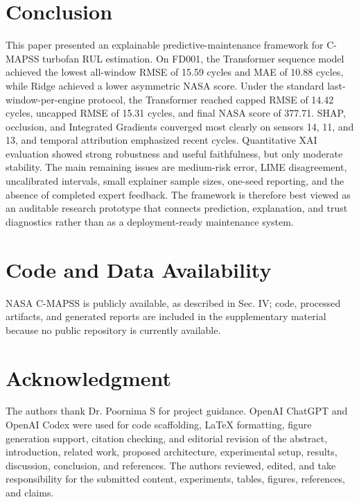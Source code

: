 \documentclass[conference]{IEEEtran}
\begin{document}
\section{Conclusion}
This paper presented an explainable predictive-maintenance framework for C-MAPSS turbofan RUL estimation. On FD001, the Transformer sequence model achieved the lowest all-window RMSE of 15.59 cycles and MAE of 10.88 cycles, while Ridge achieved a lower asymmetric NASA score. Under the standard last-window-per-engine protocol, the Transformer reached capped RMSE of 14.42 cycles, uncapped RMSE of 15.31 cycles, and final NASA score of 377.71. SHAP, occlusion, and Integrated Gradients converged most clearly on sensors 14, 11, and 13, and temporal attribution emphasized recent cycles. Quantitative XAI evaluation showed strong robustness and useful faithfulness, but only moderate stability. The main remaining issues are medium-risk error, LIME disagreement, uncalibrated intervals, small explainer sample sizes, one-seed reporting, and the absence of completed expert feedback. The framework is therefore best viewed as an auditable research prototype that connects prediction, explanation, and trust diagnostics rather than as a deployment-ready maintenance system.

\section*{Code and Data Availability}
NASA C-MAPSS is publicly available, as described in Sec. IV; code, processed artifacts, and generated reports are included in the supplementary material because no public repository is currently available.

\section*{Acknowledgment}
The authors thank Dr. Poornima S for project guidance. OpenAI ChatGPT and OpenAI Codex were used for code scaffolding, LaTeX formatting, figure generation support, citation checking, and editorial revision of the abstract, introduction, related work, proposed architecture, experimental setup, results, discussion, conclusion, and references. The authors reviewed, edited, and take responsibility for the submitted content, experiments, tables, figures, references, and claims.
\end{document}
